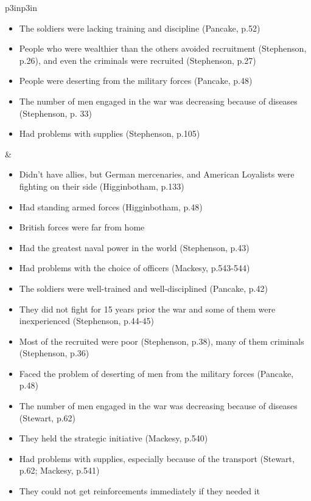 \begin{singlespace}
\begin{mpxtabular}{p{3in}p{3in}}
\begin{itemize}[nolistsep,leftmargin=*]
	    \item  The soldiers were lacking training and discipline (Pancake, p.52) 
	    \item  People who were wealthier than the others avoided recruitment (Stephenson, p.26), and even the criminals were recruited (Stephenson, p.27) 
	    \item  People were deserting from the military forces (Pancake, p.48) 
	    \item  The number of men engaged in the war was decreasing because of diseases (Stephenson, p. 33) 
	    \item  Had problems with supplies (Stephenson, p.105)
	\end{itemize}
	&
	\begin{itemize}[nolistsep,leftmargin=*]
	    \item  Didn’t have allies, but German mercenaries, and American Loyalists were fighting on their side (Higginbotham, p.133) 
	    \item  Had standing armed forces (Higginbotham, p.48) 
	    \item  British forces were far from home 
	    \item  Had the greatest naval power in the world (Stephenson, p.43) 
	    \item  Had problems with the choice of officers (Mackesy, p.543-544) 
	    \item  The soldiers were well-trained and well-disciplined (Pancake, p.42) 
	    \item  They did not fight for 15 years prior the war and some of them were inexperienced (Stephenson, p.44-45) 
	    \item  Most of the recruited were poor (Stephenson, p.38), many of them criminals (Stephenson, p.36) 
	    \item  Faced the problem of deserting of men from the military forces (Pancake, p.48) 
	    \item  The number of men engaged in the war was decreasing because of diseases (Stewart, p.62) 
	    \item  They held the strategic initiative (Mackesy, p.540) 
	    \item  Had problems with supplies, especially because of the transport (Stewart, p.62; Mackesy, p.541) 
	    \item  They could not get reinforcements immediately if they needed it
	\end{itemize}\ML
	\ML
	\begin{itemize}[nolistsep,leftmargin=*]

\end{itemize}
\end{mpxtabular}
\end{singlespace}
